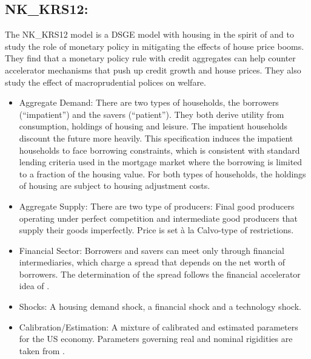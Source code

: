\documentclass[11pt,a4paper]{article}
\begin{document}
	
	
	\subsection{NK\_KRS12: \texorpdfstring{\cite{KannanRabanalScott2012}}{Kannan et al. (2012)}}
	\label{NKKRS12}
	The NK\_KRS12 model is a DSGE model with housing in the spirit of \cite{Iacoviello2005} and \cite{IacovielloNeri2010} to study the role of monetary policy in mitigating the effects of house price booms. They find that a monetary policy rule with credit aggregates can help counter accelerator mechanisms that push up credit growth and house prices. They also study the effect of macroprudential polices on welfare.
	
	\begin{itemize}
		\item Aggregate Demand: There are two types of households, the borrowers (``impatient'') and the savers (``patient''). They both derive utility from consumption, holdings of housing and leisure. The impatient households discount the future more heavily. This specification induces the impatient households to face borrowing constraints, which is consistent with standard lending criteria used in the mortgage market where the borrowing is limited to a fraction of the housing value. For both types of households, the holdings of housing are subject to housing adjustment costs.
		
		\item Aggregate Supply: There are two type of producers: Final good producers operating under perfect competition and intermediate good producers that supply their goods imperfectly. Price is set \`{a} la  Calvo-type of restrictions.
		
		\item Financial Sector: Borrowers and savers can meet only through financial intermediaries, which charge a spread that depends on the net worth
		of borrowers. The determination of the spread follows the financial accelerator idea of \cite{BernankeGertlerGilchrist1999}.
		
		\item Shocks: A housing demand shock, a financial shock and a technology shock.
		
		\item Calibration/Estimation: A mixture of calibrated and estimated parameters for the US economy. Parameters governing real and nominal rigidities are taken from \cite{IacovielloNeri2010}.
	\end{itemize}
	
\end{document}
